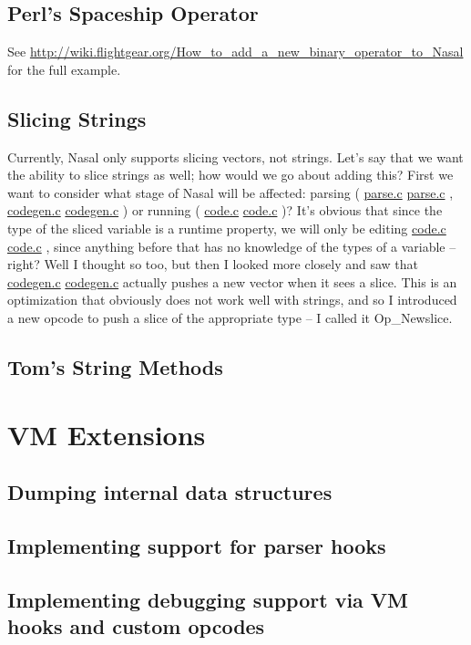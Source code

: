 \documentclass{article}
\newcommand{\todo}[1]{}
\newcommand{\comment}[1]{}%
\newcommand{\nasalsourcefile}[2][]{%
  \ifthenelse{\isempty{#1}}%
    {%
      \textcolor{source}{%
        \href{https://github.com/andyross/nasal/blob/master/src/#2}{#2}%
      }%
    }%
    {%
      \textcolor{source}{%
        \href{https://github.com/andyross/nasal/blob/master/src/#2\#L#1}{#2}%
      }%
    }%
}
\begin{document}

\subsection{Perl's Spaceship Operator}
See \url{http://wiki.flightgear.org/How_to_add_a_new_binary_operator_to_Nasal} for the full example.

\subsection{Slicing Strings}
Currently, Nasal only supports slicing vectors, not strings.  Let's say that we want the ability to slice strings as well; how would we go about adding this?  First we want to consider what stage of Nasal will be affected: parsing (\nasalsourcefile{parse.c}, \nasalsourcefile{codegen.c}) or running (\nasalsourcefile{code.c})?  It's obvious that since the type of the sliced variable is a runtime property, we will only be editing \nasalsourcefile{code.c}, since anything before that has no knowledge of the types of a variable -- right?  Well I thought so too, but then I looked more closely and saw that \nasalsourcefile{codegen.c} actually pushes a new vector when it sees a slice.  This is an optimization that obviously does not work well with strings, and so I introduced a new opcode to push a slice of the appropriate type -- I called it \textcolor{opcode}{\sc Op\_Newslice}.

\subsection{Tom's String Methods}


\section{VM Extensions}
\todo{Hooray is currently playing around with a bunch of related branches}
\subsection{Dumping internal data structures}
\subsection{Implementing support for parser hooks}
\subsection{Implementing debugging support via VM hooks and custom opcodes}
\comment{breakpoint on call, breakpoint on read/write, conditional breakpoints}
\end{document}
